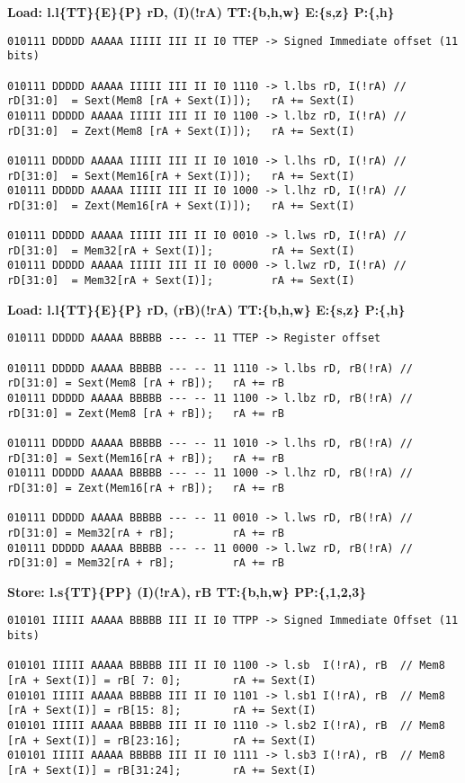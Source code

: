 \begin{landscape}
\textbf{Load: l.l\{TT\}\{E\}\{P\} rD, (I)(!rA) TT:\{b,h,w\} E:\{s,z\} P:\{,h\}}

\begin{verbatim}
010111 DDDDD AAAAA IIIII III II I0 TTEP -> Signed Immediate offset (11 bits)

010111 DDDDD AAAAA IIIII III II I0 1110 -> l.lbs rD, I(!rA) // rD[31:0]  = Sext(Mem8 [rA + Sext(I)]);   rA += Sext(I)
010111 DDDDD AAAAA IIIII III II I0 1100 -> l.lbz rD, I(!rA) // rD[31:0]  = Zext(Mem8 [rA + Sext(I)]);   rA += Sext(I)

010111 DDDDD AAAAA IIIII III II I0 1010 -> l.lhs rD, I(!rA) // rD[31:0]  = Sext(Mem16[rA + Sext(I)]);   rA += Sext(I)
010111 DDDDD AAAAA IIIII III II I0 1000 -> l.lhz rD, I(!rA) // rD[31:0]  = Zext(Mem16[rA + Sext(I)]);   rA += Sext(I)

010111 DDDDD AAAAA IIIII III II I0 0010 -> l.lws rD, I(!rA) // rD[31:0]  = Mem32[rA + Sext(I)];         rA += Sext(I)
010111 DDDDD AAAAA IIIII III II I0 0000 -> l.lwz rD, I(!rA) // rD[31:0]  = Mem32[rA + Sext(I)];         rA += Sext(I)
\end{verbatim}


\textbf{Load: l.l\{TT\}\{E\}\{P\} rD, (rB)(!rA)  TT:\{b,h,w\} E:\{s,z\} P:\{,h\}}

\begin{verbatim}
010111 DDDDD AAAAA BBBBB --- -- 11 TTEP -> Register offset

010111 DDDDD AAAAA BBBBB --- -- 11 1110 -> l.lbs rD, rB(!rA) // rD[31:0] = Sext(Mem8 [rA + rB]);   rA += rB
010111 DDDDD AAAAA BBBBB --- -- 11 1100 -> l.lbz rD, rB(!rA) // rD[31:0] = Zext(Mem8 [rA + rB]);   rA += rB

010111 DDDDD AAAAA BBBBB --- -- 11 1010 -> l.lhs rD, rB(!rA) // rD[31:0] = Sext(Mem16[rA + rB]);   rA += rB
010111 DDDDD AAAAA BBBBB --- -- 11 1000 -> l.lhz rD, rB(!rA) // rD[31:0] = Zext(Mem16[rA + rB]);   rA += rB

010111 DDDDD AAAAA BBBBB --- -- 11 0010 -> l.lws rD, rB(!rA) // rD[31:0] = Mem32[rA + rB];         rA += rB
010111 DDDDD AAAAA BBBBB --- -- 11 0000 -> l.lwz rD, rB(!rA) // rD[31:0] = Mem32[rA + rB];         rA += rB
\end{verbatim}


\clearpage
\textbf{Store: l.s\{TT\}\{PP\} (I)(!rA), rB TT:\{b,h,w\} PP:\{,1,2,3\}}

\begin{verbatim}
010101 IIIII AAAAA BBBBB III II I0 TTPP -> Signed Immediate Offset (11 bits)

010101 IIIII AAAAA BBBBB III II I0 1100 -> l.sb  I(!rA), rB  // Mem8 [rA + Sext(I)] = rB[ 7: 0];        rA += Sext(I)
010101 IIIII AAAAA BBBBB III II I0 1101 -> l.sb1 I(!rA), rB  // Mem8 [rA + Sext(I)] = rB[15: 8];        rA += Sext(I)
010101 IIIII AAAAA BBBBB III II I0 1110 -> l.sb2 I(!rA), rB  // Mem8 [rA + Sext(I)] = rB[23:16];        rA += Sext(I)
010101 IIIII AAAAA BBBBB III II I0 1111 -> l.sb3 I(!rA), rB  // Mem8 [rA + Sext(I)] = rB[31:24];        rA += Sext(I)


\end{verbatim}
\end{landscape}
